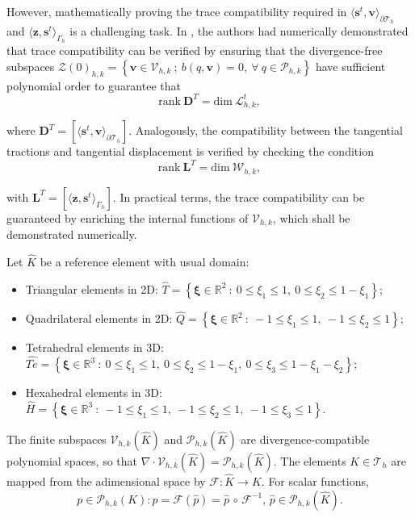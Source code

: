 \documentclass[english,11pt,3p,number,sort&compress]{elsarticle}
\begin{document}
However, mathematically proving the trace compatibility required in $\langle\bm{s}^t,\bm{v}\rangle_{\partial\mathcal{T}_h}$ and $\langle\bm{z},\bm{s}^t\rangle_{\Gamma_h}$ is a challenging task. In \cite{carvalho2024semi}, the authors had numerically demonstrated that trace compatibility can be verified by ensuring that the divergence-free subspaces $\mathcal{Z}(0)_{h,k}=\left\{ \bm{v} \in \mathcal{V}_{h,k} ~;~b(q,\bm{v})=0, ~\forall~q \in \mathcal{P}_{h,k} \right\}$ have sufficient polynomial order to guarantee that
\begin{equation*}
	\text{rank}~ \bm{D}^T = \text{dim} ~\mathcal{L}^t_{h,k},
\end{equation*}

\noindent where $\bm{D}^T=[\langle\bm{s}^t,\bm{v}\rangle_{\partial\mathcal{T}_h}]$. Analogously, the compatibility between the tangential tractions and tangential displacement is verified by checking the condition
\begin{equation*}
	\text{rank}~ \bm{L}^T = \text{dim} ~\mathcal{W}_{h,k},
\end{equation*}

\noindent with $\bm{L}^T=[\langle\bm{z},\bm{s}^t\rangle_{\Gamma_h}]$. In practical terms, the trace compatibility can be guaranteed by enriching the internal functions of $\mathcal{V}_{h,k}$, which shall be demonstrated numerically.

Let $\hat{K}$ be a reference element with usual domain:
\begin{itemize}
	\item Triangular elements in 2D: $\hat{T}= \left\{ \bm{\xi} \in \mathbb{R}^2 ~:~ 0 \leq \xi_1 \leq 1, ~0 \leq \xi_2 \leq 1-\xi_1 \right\}$;
	\item Quadrilateral elements in 2D: $\hat{Q}= \left\{ \bm{\xi} \in \mathbb{R}^2 ~:~ -1 \leq \xi_1 \leq 1, ~-1 \leq \xi_2 \leq 1 \right\}$;
	\item Tetrahedral elements in 3D: $\hat{Te}= \left\{ \bm{\xi} \in \mathbb{R}^3 ~:~ 0 \leq \xi_1 \leq 1, ~0 \leq \xi_2 \leq 1-\xi_1, ~0 \leq \xi_3 \leq 1-\xi_1-\xi_2 \right\}$;
	\item Hexahedral elements in 3D: $\hat{H}= \left\{ \bm{\xi} \in \mathbb{R}^3 ~:~ -1 \leq \xi_1 \leq 1, ~-1 \leq \xi_2 \leq 1, ~-1 \leq \xi_3 \leq 1 \right\}$.
\end{itemize}

The finite subspaces $\mathcal{V}_{h,k}(\hat{K})$ and $\mathcal{P}_{h,k}(\hat{K})$ are divergence-compatible polynomial spaces, so that $\nabla \cdot \mathcal{V}_{h,k}(\hat{K}) = \mathcal{P}_{h,k}(\hat{K})$. The elements $K \in \mathcal{T}_h$ are mapped from the adimensional space by $\mathcal{F}: \hat{K}\rightarrow K$. For scalar functions, 
\begin{equation*}p \in \mathcal{P}_{h,k}(K):p=\mathcal{F}(\hat{p}) = \hat{p}\,\circ\,\mathcal{F}^{-1}, \, \hat{p} \in \mathcal{P}_{h,k}(\hat{K}).	
\end{equation*}
\end{document}
